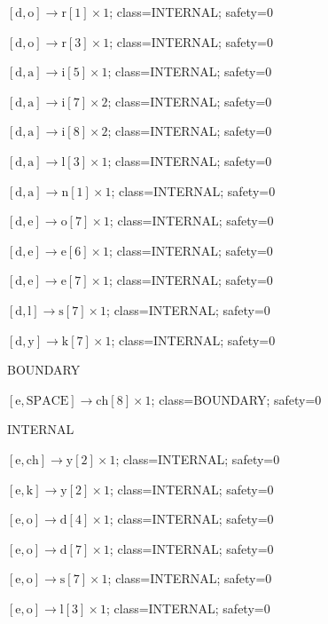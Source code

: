 \(\left[\mathrm{d}, \mathrm{o}\right] \to \mathrm{r}[1] \times 1\); class=INTERNAL; safety=0\par
\(\left[\mathrm{d}, \mathrm{o}\right] \to \mathrm{r}[3] \times 1\); class=INTERNAL; safety=0\par
\(\left[\mathrm{d}, \mathrm{a}\right] \to \mathrm{i}[5] \times 1\); class=INTERNAL; safety=0\par
\(\left[\mathrm{d}, \mathrm{a}\right] \to \mathrm{i}[7] \times 2\); class=INTERNAL; safety=0\par
\(\left[\mathrm{d}, \mathrm{a}\right] \to \mathrm{i}[8] \times 2\); class=INTERNAL; safety=0\par
\(\left[\mathrm{d}, \mathrm{a}\right] \to \mathrm{l}[3] \times 1\); class=INTERNAL; safety=0\par
\(\left[\mathrm{d}, \mathrm{a}\right] \to \mathrm{n}[1] \times 1\); class=INTERNAL; safety=0\par
\(\left[\mathrm{d}, \mathrm{e}\right] \to \mathrm{o}[7] \times 1\); class=INTERNAL; safety=0\par
\(\left[\mathrm{d}, \mathrm{e}\right] \to \mathrm{e}[6] \times 1\); class=INTERNAL; safety=0\par
\(\left[\mathrm{d}, \mathrm{e}\right] \to \mathrm{e}[7] \times 1\); class=INTERNAL; safety=0\par
\(\left[\mathrm{d}, \mathrm{l}\right] \to \mathrm{s}[7] \times 1\); class=INTERNAL; safety=0\par
\(\left[\mathrm{d}, \mathrm{y}\right] \to \mathrm{k}[7] \times 1\); class=INTERNAL; safety=0\par
BOUNDARY\par
\(\left[\mathrm{e}, \mathrm{SPACE}\right] \to \mathrm{ch}[8] \times 1\); class=BOUNDARY; safety=0\par
INTERNAL\par
\(\left[\mathrm{e}, \mathrm{ch}\right] \to \mathrm{y}[2] \times 1\); class=INTERNAL; safety=0\par
\(\left[\mathrm{e}, \mathrm{k}\right] \to \mathrm{y}[2] \times 1\); class=INTERNAL; safety=0\par
\(\left[\mathrm{e}, \mathrm{o}\right] \to \mathrm{d}[4] \times 1\); class=INTERNAL; safety=0\par
\(\left[\mathrm{e}, \mathrm{o}\right] \to \mathrm{d}[7] \times 1\); class=INTERNAL; safety=0\par
\(\left[\mathrm{e}, \mathrm{o}\right] \to \mathrm{s}[7] \times 1\); class=INTERNAL; safety=0\par
\(\left[\mathrm{e}, \mathrm{o}\right] \to \mathrm{l}[3] \times 1\); class=INTERNAL; safety=0\par
